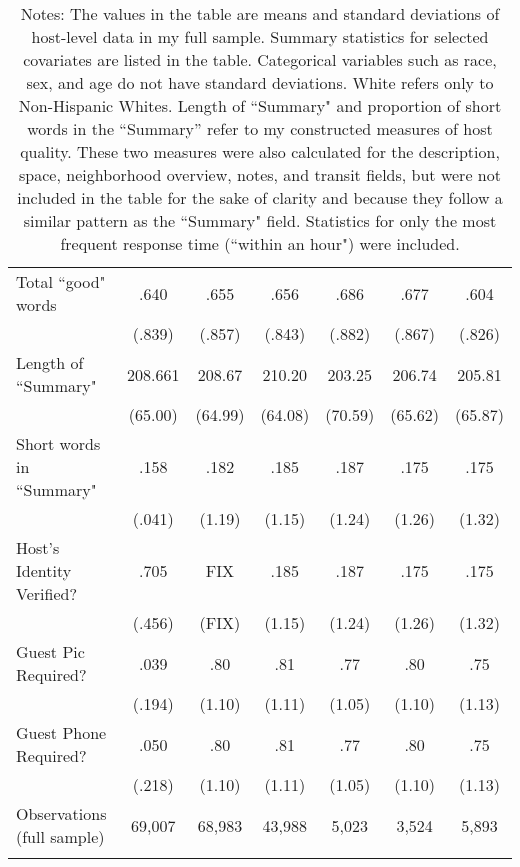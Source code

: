 {\begin{longtable}{l*{6}{c}}
		Total ``good" words       & .640   &      .655&      .656&       .686         &      .677    &	.604     \\
		& (.839) &     (.857)         &     (.843)         &     (.882)         &     (.867)         &		(.826)\\

		Length of ``Summary"      &   208.661  &      208.67 	&      210.20	&       203.25         &      206.74    &	205.81     \\
		&(65.00) &       (64.99)  &    (64.08)         &     (70.59)         &     (65.62)         &     (65.87) \\

		Short words in ``Summary"          & .158 &      .182		&      .185		&       .187         &      .175    &	.175     \\
		&(.041) &     (1.19)         &     (1.15)         &     (1.24)         &     (1.26)         &		(1.32)\\                    

		Host's Identity Verified?          & .705 &      FIX		&      .185		&       .187         &      .175    &	.175     \\
		&(.456) &     (FIX)         &     (1.15)         &     (1.24)         &     (1.26)         &		(1.32)\\                    

		Guest Pic Required?   &   .039  &      .80		&      .81&      .77 &      .80  	& 	.75\\
		&  (.194)  & (1.10)     &     (1.11)         &     (1.05)         &     (1.10)         &     (1.13)         \\
		Guest Phone Required?   &   .050  &      .80		&      .81&      .77 &      .80  	& 	.75\\
		&  (.218)  & (1.10)     &     (1.11)         &     (1.05)         &     (1.10)         &     (1.13)         \\
		
		
		\hline
		Observations (full sample)    & 69,007  & 68,983   &       43,988         &       5,023         &       3,524         &       5,893         \\
		\hline\hline
		\caption*{Notes: The values in the table are means and standard deviations of host-level data in my full sample. Summary statistics for selected covariates are listed in the table. Categorical variables such as race, sex, and age do not have standard deviations. White refers only to Non-Hispanic Whites. Length of ``Summary" and proportion of short words in the ``Summary'' refer to my constructed measures of host quality. These two measures were also calculated for the description, space, neighborhood overview, notes, and transit fields, but were not included in the table for the sake of clarity and because they follow a similar pattern as the ``Summary" field. Statistics for only the most frequent response time (``within an hour") were included.}
		
	\end{longtable}
}


